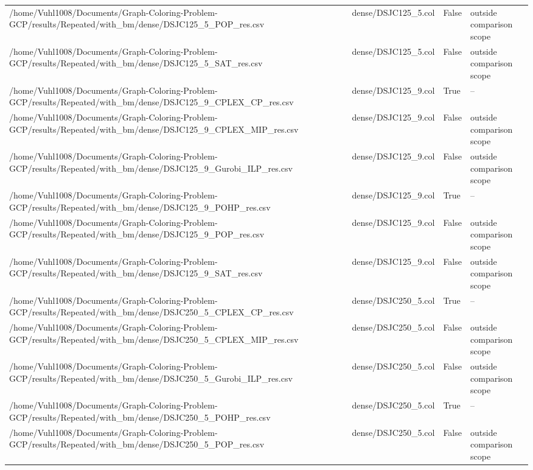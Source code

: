 \begin{table}[htbp]
\begin{tabular}{llll}
/home/Vuhl1008/Documents/Graph-Coloring-Problem-GCP/results/Repeated/with\_bm/dense/DSJC125\_5\_POP\_res.csv & dense/DSJC125\_5.col & False & outside comparison scope \\
/home/Vuhl1008/Documents/Graph-Coloring-Problem-GCP/results/Repeated/with\_bm/dense/DSJC125\_5\_SAT\_res.csv & dense/DSJC125\_5.col & False & outside comparison scope \\
/home/Vuhl1008/Documents/Graph-Coloring-Problem-GCP/results/Repeated/with\_bm/dense/DSJC125\_9\_CPLEX\_CP\_res.csv & dense/DSJC125\_9.col & True & -- \\
/home/Vuhl1008/Documents/Graph-Coloring-Problem-GCP/results/Repeated/with\_bm/dense/DSJC125\_9\_CPLEX\_MIP\_res.csv & dense/DSJC125\_9.col & False & outside comparison scope \\
/home/Vuhl1008/Documents/Graph-Coloring-Problem-GCP/results/Repeated/with\_bm/dense/DSJC125\_9\_Gurobi\_ILP\_res.csv & dense/DSJC125\_9.col & False & outside comparison scope \\
/home/Vuhl1008/Documents/Graph-Coloring-Problem-GCP/results/Repeated/with\_bm/dense/DSJC125\_9\_POHP\_res.csv & dense/DSJC125\_9.col & True & -- \\
/home/Vuhl1008/Documents/Graph-Coloring-Problem-GCP/results/Repeated/with\_bm/dense/DSJC125\_9\_POP\_res.csv & dense/DSJC125\_9.col & False & outside comparison scope \\
/home/Vuhl1008/Documents/Graph-Coloring-Problem-GCP/results/Repeated/with\_bm/dense/DSJC125\_9\_SAT\_res.csv & dense/DSJC125\_9.col & False & outside comparison scope \\
/home/Vuhl1008/Documents/Graph-Coloring-Problem-GCP/results/Repeated/with\_bm/dense/DSJC250\_5\_CPLEX\_CP\_res.csv & dense/DSJC250\_5.col & True & -- \\
/home/Vuhl1008/Documents/Graph-Coloring-Problem-GCP/results/Repeated/with\_bm/dense/DSJC250\_5\_CPLEX\_MIP\_res.csv & dense/DSJC250\_5.col & False & outside comparison scope \\
/home/Vuhl1008/Documents/Graph-Coloring-Problem-GCP/results/Repeated/with\_bm/dense/DSJC250\_5\_Gurobi\_ILP\_res.csv & dense/DSJC250\_5.col & False & outside comparison scope \\
/home/Vuhl1008/Documents/Graph-Coloring-Problem-GCP/results/Repeated/with\_bm/dense/DSJC250\_5\_POHP\_res.csv & dense/DSJC250\_5.col & True & -- \\
/home/Vuhl1008/Documents/Graph-Coloring-Problem-GCP/results/Repeated/with\_bm/dense/DSJC250\_5\_POP\_res.csv & dense/DSJC250\_5.col & False & outside comparison scope \\

\end{tabular}
\end{table}
